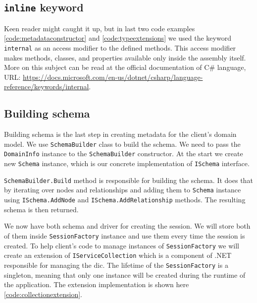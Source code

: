 \subsection{\texttt{inline} keyword}

Keen reader might caught it up, but in last two code examples \ref{code:metadataconstructor} and \ref{code:typeextensions} we used the keyword \texttt{internal}
as an access modifier to the defined methods. This access modifier makes methods, classes, and properties available only inside the assembly itself. More on this subject
can be read at the official documentation of C\# language, URL: \url{https://docs.microsoft.com/en-us/dotnet/csharp/language-reference/keywords/internal}.

\subsection {Building schema}

Building schema is the last step in creating metadata for the client's domain model.
We use \texttt{SchemaBuilder} class to build the schema. We need to pass the \texttt{DomainInfo} instance to the \texttt{SchemaBuilder} constructor.
At the start we create new \texttt{Schema} instance, which is our concrete implementation of \texttt{ISchema} interface.

\texttt{SchemaBuilder.Build} method is responsible for building the schema. It does that by iterating over nodes and relationships and adding them to \texttt{Schema} instance
using \texttt{ISchema.AddNode} and \texttt{ISchema.AddRelationship} methods. The resulting schema is then returned.

We now have both schema and driver for creating the session. We will store both of them inside \texttt{SessionFactory} instance
and use them every time the session is created. To help client's code to manage instances of \texttt{SessionFactory} we will create an extension
of \texttt{IServiceCollection} which is a component of .NET responsible for managing the \acrfull{dic}. The lifetime of the \texttt{SessionFactory} is
a singleton, meaning that only one instance will be created during the runtime of the application. The extension implementation is shown here \ref{code:collectionextension}.


